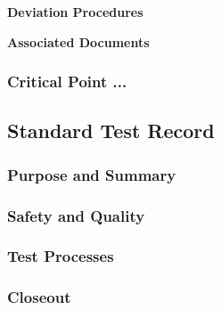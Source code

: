 \textbf{Deviation Procedures}

\textbf{Associated Documents}


\subsubsection{Critical Point ...}

\subsection{Standard Test Record}

\subsubsection{Purpose and Summary}

\subsubsection{Safety and Quality}

\subsubsection{Test Processes}


\subsubsection{Closeout}